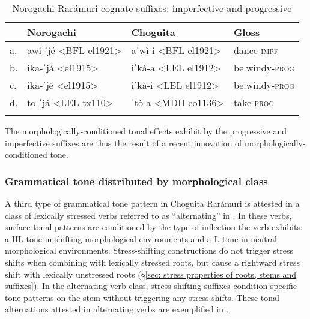 \begin{table}
\caption{Norogachi Rarámuri cognate suffixes: imperfective and progressive}
\label{tab:norogachi-raramuri}

\begin{tabularx}{\textwidth}{llll}
\lsptoprule
&\textbf{Norogachi} & \textbf{Choguita} & \textbf{Gloss} \\
\midrule
a.& awi-ˈjé <BFL el1921> & aˈwì-i <BFL el1921> &dance-\textsc{impf}\\
b.& ika-ˈjá  <el1915> & iˈkà-a  <LEL el1912>&	be.windy-\textsc{prog}\\
c.& ika-ˈjé  <el1915> & iˈkà-i  <LEL el1912> & be.windy-\textsc{prog}\\
d.& to-ˈjá	<LEL tx110> & ˈtò-a <MDH co1136> & take-\textsc{prog}\\
\lspbottomrule
\end{tabularx}
\end{table}

The morphologically-conditioned tonal effects exhibit by the progressive and imperfective suffixes are thus the result of a recent innovation of morphologically-conditioned tone.

\subsubsection{Grammatical tone distributed by morphological class}
\label{subsubsec: grammatical tone distributed by morphological class}

A third type of grammatical tone pattern in Choguita Rarámuri is attested in a class of lexically stressed verbs referred to as ``alternating'' in \citet{caballero2015tone}. In these verbs, surface tonal patterns are conditioned by the type of inflection the verb exhibits: a HL tone in shifting morphological environments and a L tone in neutral morphological environments. Stress-shifting constructions do not trigger stress shifts when combining with lexically stressed roots, but cause a rightward stress shift with lexically unstressed roots (§\ref{sec: stress properties of roots, stems and suffixes}). In the alternating verb class, stress-shifting suffixes condition specific tone patterns on the stem without triggering any stress shifts. These tonal alternations attested in alternating verbs are exemplified in .


